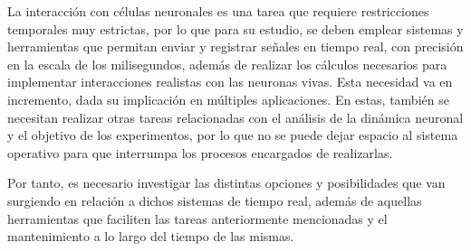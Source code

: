 
La interacción con células neuronales es una tarea que requiere restricciones temporales muy estrictas, 
por lo que para su estudio, se deben emplear sistemas y herramientas que permitan enviar y registrar 
señales en tiempo real, con precisión en la escala de los milisegundos, además de realizar los cálculos necesarios para implementar interacciones realistas con las neuronas vivas. 
Esta necesidad va en incremento, dada su implicación en múltiples aplicaciones. En estas, también se 
necesitan realizar otras tareas relacionadas con el análisis de la dinámica neuronal y el objetivo de los experimentos, por lo que no se puede 
dejar espacio al sistema operativo para que interrumpa los procesos encargados de realizarlas.

Por tanto, es necesario investigar las distintas opciones y posibilidades 
que van surgiendo en relación a dichos sistemas de tiempo real, además de aquellas herramientas que faciliten las tareas 
anteriormente mencionadas y el mantenimiento a lo largo del tiempo de las mismas.
